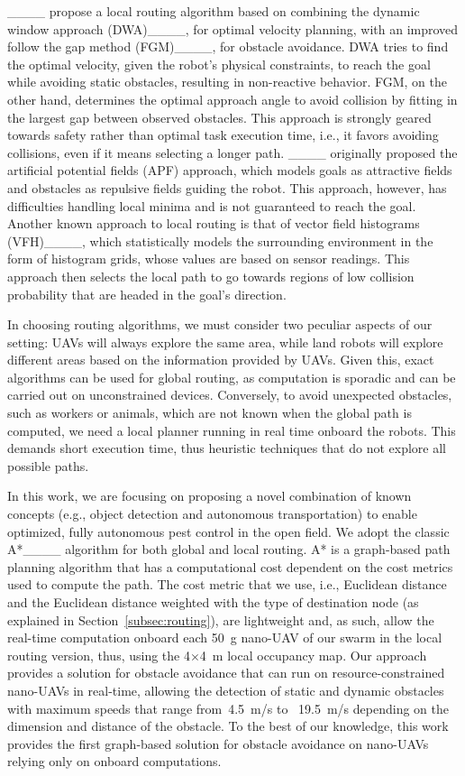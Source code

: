 ____ propose a local routing algorithm based on combining the dynamic window approach (DWA)____, for optimal velocity planning, with an improved follow the gap method (FGM)____, for obstacle avoidance.  
DWA tries to find the optimal velocity, given the robot's physical constraints, to reach the goal while avoiding static obstacles, resulting in non-reactive behavior.  
FGM, on the other hand, determines the optimal approach angle to avoid collision by fitting in the largest gap between observed obstacles. 
This approach is strongly geared towards safety rather than optimal task execution time, i.e., it favors avoiding collisions, even if it means selecting a longer path.
____ originally proposed the artificial potential fields (APF) approach, which models goals as attractive fields and obstacles as repulsive fields guiding the robot. 
This approach, however, has difficulties handling local minima and is not guaranteed to reach the goal.  
Another known approach to local routing is that of vector field histograms (VFH)____, which statistically models the surrounding environment in the form of histogram grids, whose values are based on sensor readings. 
This approach then selects the local path to go towards regions of low collision probability that are headed in the goal's direction.  

In choosing routing algorithms, we must consider two peculiar aspects of our setting: UAVs will always explore the same area, while land robots will explore different areas based on the information provided by UAVs. 
Given this, exact algorithms can be used for global routing, as computation is sporadic and can be carried out on unconstrained devices.
Conversely, to avoid unexpected obstacles, such as workers or animals, which are not known when the global path is computed, we need a local planner running in real time onboard the robots.
This demands short execution time, thus heuristic techniques that do not explore all possible paths.

In this work, we are focusing on proposing a novel combination of known concepts (e.g., object detection and autonomous transportation) to enable optimized, fully autonomous pest control in the open field.
We adopt the classic A*____ algorithm for both global and local routing.
A* is a graph-based path planning algorithm that has a computational cost dependent on the cost metrics used to compute the path.
The cost metric that we use, i.e., Euclidean distance and the Euclidean distance weighted with the type of destination node (as explained in Section~\ref{subsec:routing}), are lightweight and, as such, allow the real-time computation onboard each \SI{50}{\gram} nano-UAV of our swarm in the local routing version, thus, using the 4$\times$\SI{4}{\meter} local occupancy map.
Our approach provides a solution for obstacle avoidance that can run on resource-constrained nano-UAVs in real-time, allowing the detection of static and dynamic obstacles with maximum speeds that range from~\SI{4.5}{\meter/\second} to ~\SI{19.5}{\meter/\second} depending on the dimension and distance of the obstacle.
To the best of our knowledge, this work provides the first graph-based solution for obstacle avoidance on nano-UAVs relying only on onboard computations.


